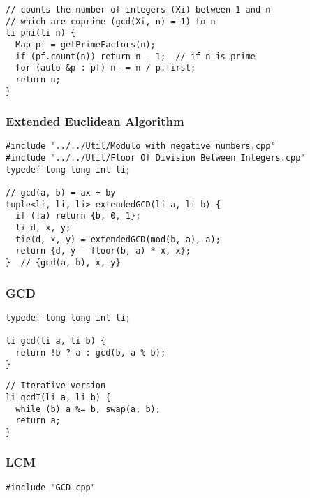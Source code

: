 \documentclass[twoside]{article}
\newcommand{\fileTitleStyle}{\large\underline}
\begin{document}
\begin{multicols*}{2}
\begin{verbatim}
// counts the number of integers (Xi) between 1 and n
// which are coprime (gcd(Xi, n) = 1) to n
li phi(li n) {
  Map pf = getPrimeFactors(n);
  if (pf.count(n)) return n - 1;  // if n is prime
  for (auto &p : pf) n -= n / p.first;
  return n;
}
\end{verbatim}

\subsubsectionfont{\centering\bfseries\Large}
\subsubsectionfont{\fileTitleStyle}
\subsubsection*{Extended Euclidean Algorithm}
\begin{verbatim}
#include "../../Util/Modulo with negative numbers.cpp"
#include "../../Util/Floor Of Division Between Integers.cpp"
typedef long long int li;

// gcd(a, b) = ax + by
tuple<li, li, li> extendedGCD(li a, li b) {
  if (!a) return {b, 0, 1};
  li d, x, y;
  tie(d, x, y) = extendedGCD(mod(b, a), a);
  return {d, y - floor(b, a) * x, x};
}  // {gcd(a, b), x, y}
\end{verbatim}

\subsubsectionfont{\centering\bfseries\Large}
\subsubsectionfont{\fileTitleStyle}
\subsubsection*{GCD}
\begin{verbatim}
typedef long long int li;

li gcd(li a, li b) {
  return !b ? a : gcd(b, a % b);
}
\end{verbatim}
\vspace{-12pt}
\begin{verbatim}
// Iterative version
li gcdI(li a, li b) {
  while (b) a %= b, swap(a, b);
  return a;
}
\end{verbatim}

\subsubsectionfont{\centering\bfseries\Large}
\subsubsectionfont{\fileTitleStyle}
\subsubsection*{LCM}
\begin{verbatim}
#include "GCD.cpp"


\end{verbatim}
\end{multicols*}
\end{document}
